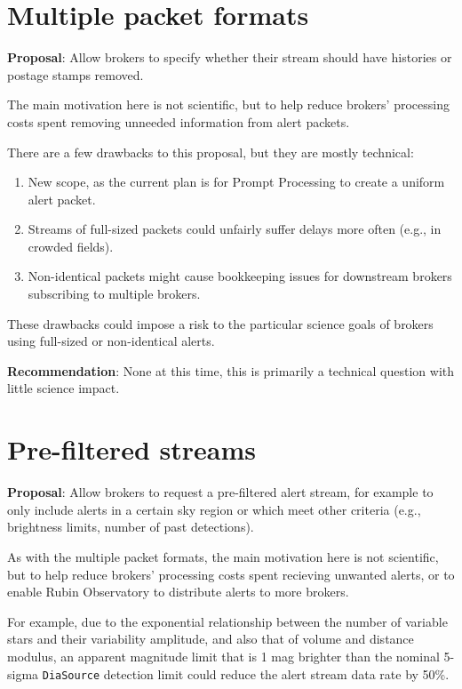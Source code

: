 \documentclass[DM,authoryear,toc]{lsstdoc}
\begin{document}
\section{Multiple packet formats}\label{sec:multiformats}

\textbf{Proposal}: Allow brokers to specify whether their stream should have histories or postage stamps removed.

The main motivation here is not scientific, but to help reduce brokers' processing costs spent removing unneeded information 
from alert packets. 

There are a few drawbacks to this proposal, but they are mostly technical:

\begin{enumerate}
\item New scope, as the current plan is for Prompt Processing to create a uniform alert packet.
\item Streams of full-sized packets could unfairly suffer delays more often (e.g., in crowded fields).
\item Non-identical packets might cause bookkeeping issues for downstream brokers subscribing to multiple brokers.
\end{enumerate}

These drawbacks could impose a risk to the particular science goals of brokers using full-sized or non-identical alerts.

\textbf{Recommendation}: None at this time, this is primarily a technical question with little science impact.


\section{Pre-filtered streams}\label{sec:prefilter}

\textbf{Proposal}: Allow brokers to request a pre-filtered alert stream, for example to only include alerts in a certain sky 
region or which meet other criteria (e.g., brightness limits, number of past detections).

As with the multiple packet formats, the main motivation here is not scientific, but to help reduce brokers' processing costs 
spent recieving unwanted alerts, or to enable Rubin Observatory to distribute alerts to more brokers.

For example, due to the exponential relationship between the number of variable stars and their variability amplitude, and 
also that of volume and distance modulus, an apparent magnitude limit that is 1 mag brighter than the nominal 5-sigma \texttt{DiaSource} 
detection limit could reduce the alert stream data rate by 50\%.
\end{document}
